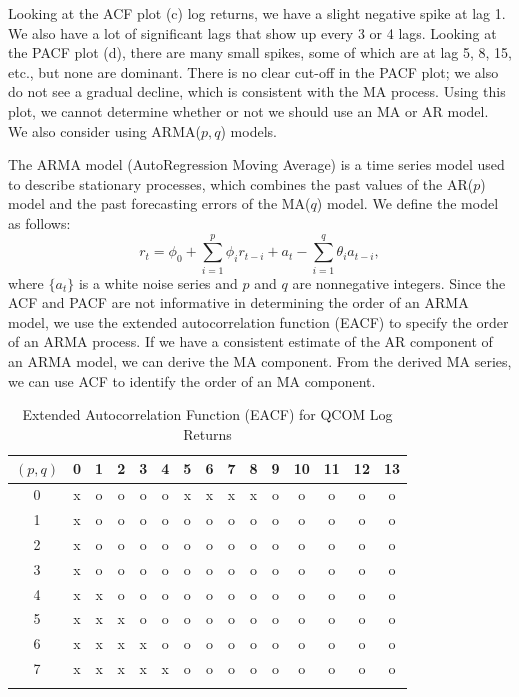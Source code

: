 \documentclass[12pt]{article}
\begin{document}
Looking at the ACF plot (c) log returns, we have a slight negative spike at lag 1. We also have a lot of significant lags that show up every 3 or 4 lags. Looking at the PACF plot (d), there are many small spikes, some of which are at lag 5, 8, 15, etc., but none are dominant. There is no clear cut-off in the PACF plot; we also do not see a gradual decline, which is consistent with the MA process. Using this plot, we cannot determine whether or not we should use an MA or AR model. We also consider using ARMA($p,q$) models.

The ARMA model (AutoRegression Moving Average) is a time series model used to describe stationary processes, which combines the past values of the AR($p$) model and the past forecasting errors of the MA($q$) model. We define the model as follows:
\begin{equation}
	r_t=\phi_0+\sum_{i=1}^{p}\phi_ir_{t-i}+a_t-\sum_{i=1}^{q}\theta_ia_{t-i},
\end{equation}
where $\lbrace a_t\rbrace$ is a white noise series and $p$ and $q$ are nonnegative integers. Since the ACF and PACF are not informative in determining the order of an ARMA model, we use the extended autocorrelation function (EACF) to specify the order of an ARMA process. If we have a consistent estimate of the AR component of an ARMA model, we can derive the MA component. From the derived MA series, we can use ACF to identify the order of an MA component.
\begin{table}[H]
	\centering
	\caption{Extended Autocorrelation Function (EACF) for QCOM Log Returns}
	\begin{tabular}{c|cccccccccccccc}
		$(p, q)$ & 0 & 1 & 2 & 3 & 4 & 5 & 6 & 7 & 8 & 9 & 10 & 11 & 12 & 13 \\
		\hline
		0 & x & o & o & o & o & x & x & x & x & o & o & o & o & o \\
		1 & x & o & o & o & o & o & o & o & o & o & o & o & o & o \\
		2 & x & o & o & o & o & o & o & o & o & o & o & o & o & o \\
		3 & x & o & o & o & o & o & o & o & o & o & o & o & o & o \\
		4 & x & x & o & o & o & o & o & o & o & o & o & o & o & o \\
		5 & x & x & x & o & o & o & o & o & o & o & o & o & o & o \\
		6 & x & x & x & x & o & o & o & o & o & o & o & o & o & o \\
		7 & x & x & x & x & x & o & o & o & o & o & o & o & o & o \\
		\label{tab:eacf}
	\end{tabular}
\end{table}
\end{document}
